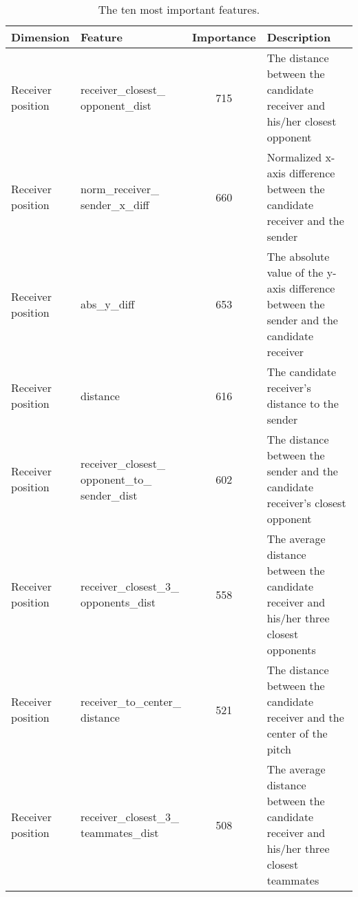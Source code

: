 \setlength{\tabcolsep}{3pt}
\begin{table}[!t]
\caption{The ten most important features.}
\centering
\resizebox{1.0\textwidth}{!} {
\begin{threeparttable}
\begin{tabular}{llcp{6cm}}
  \toprule
  Dimension & Feature & Importance & Description \\
  \midrule
  \specialcell{Receiver\\position\tnote{1}} & \specialcell{receiver\_closest\_\\opponent\_dist} & 715 &  The distance between the candidate receiver and his/her closest opponent \\
  \specialcell{Receiver\\position} & \specialcell{norm\_receiver\_\\sender\_x\_diff} & 660 & Normalized x-axis difference between the candidate receiver and the sender \\
  \specialcell{Receiver\\position} & abs\_y\_diff & 653 & The absolute value of the y-axis difference between the sender and the candidate receiver \\
  \specialcell{Receiver\\position} & distance & 616 & The candidate receiver's distance to the sender \\
  \specialcell{Receiver\\position} & \specialcell{receiver\_closest\_\\opponent\_to\_\\sender\_dist} & 602 & The distance between the sender and the candidate receiver's closest opponent \\
  \specialcell{Receiver\\position} & \specialcell{receiver\_closest\_3\_\\opponents\_dist} & 558 & The average distance between the candidate receiver and his/her three closest opponents \\
  \specialcell{Receiver\\position} & \specialcell{receiver\_to\_center\_\\distance} & 521 & The distance between the candidate receiver and the center of the pitch \\
  \specialcell{Receiver\\position} & \specialcell{receiver\_closest\_3\_\\teammates\_dist} & 508 & The average distance between the candidate receiver and his/her three closest teammates \\

\end{tabular}
\end{threeparttable}}
\end{table}
